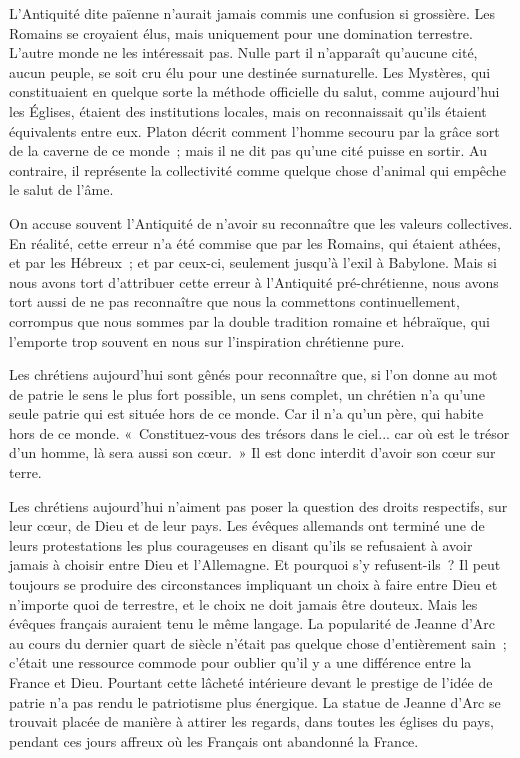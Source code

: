 \documentclass[french,twoside]{book} %
\begin{document}
L'Antiquité dite païenne n'aurait jamais commis une confusion si grossière. Les Romains se croyaient élus, mais uniquement pour une domination terrestre. L'autre monde ne les intéressait pas. Nulle part il n'apparaît qu'aucune cité, aucun peuple, se soit cru élu pour une destinée surnaturelle. Les Mystères, qui constituaient en quelque sorte la méthode officielle du salut, comme aujourd'hui les Églises, étaient des institutions locales, mais on reconnaissait qu'ils étaient équivalents entre eux. Platon décrit comment l'homme secouru par la grâce sort de la caverne de ce monde ; mais il ne dit pas qu'une cité puisse en sortir. Au contraire, il représente la collectivité comme quelque chose d'animal qui empêche le salut de l'âme.\par
On accuse souvent l'Antiquité de n'avoir su reconnaître que les valeurs collectives. En réalité, cette erreur n'a été commise que par les Romains, qui étaient athées, et par les Hébreux ; et par ceux-ci, seulement jusqu'à l'exil à Babylone. Mais si nous avons tort d'attribuer cette erreur à l'Antiquité pré-chrétienne, nous avons tort aussi de ne pas reconnaître que nous la commettons continuellement, corrompus que nous sommes par la double tradition romaine et hébraïque, qui l'emporte trop souvent en nous sur l'inspiration chrétienne pure.\par
Les chrétiens aujourd'hui sont gênés pour reconnaître que, si l'on donne au mot de patrie le sens le plus fort possible, un sens complet, un chrétien n'a qu'une seule patrie qui est située hors de ce monde. Car il n'a qu'un père, qui habite hors de ce monde. « Constituez-vous des trésors dans le ciel... car où est le trésor d'un homme, là sera aussi son cœur. » Il est donc interdit d'avoir son cœur sur terre.\par
Les chrétiens aujourd'hui n'aiment pas poser la question des droits respectifs, sur leur cœur, de Dieu et de leur pays. Les évêques allemands ont terminé une de leurs protestations les plus courageuses en disant qu'ils se refusaient à avoir jamais à choisir entre Dieu et l'Allemagne. Et pourquoi s'y refusent-ils ? Il peut toujours se produire des circonstances impliquant un choix à faire entre Dieu et n'importe quoi de terrestre, et le choix ne doit jamais être douteux. Mais les évêques français auraient tenu le même langage. La popularité de Jeanne d'Arc au cours du dernier quart de siècle n'était pas quelque chose d'entièrement sain ; c'était une ressource commode pour oublier qu'il y a une différence entre la France et Dieu. Pourtant cette lâcheté intérieure devant le prestige de l'idée de patrie n'a pas rendu le patriotisme plus énergique. La statue de Jeanne d'Arc se trouvait placée de manière à attirer les regards, dans toutes les églises du pays, pendant ces jours affreux où les Français ont abandonné la France.\par
\end{document}
